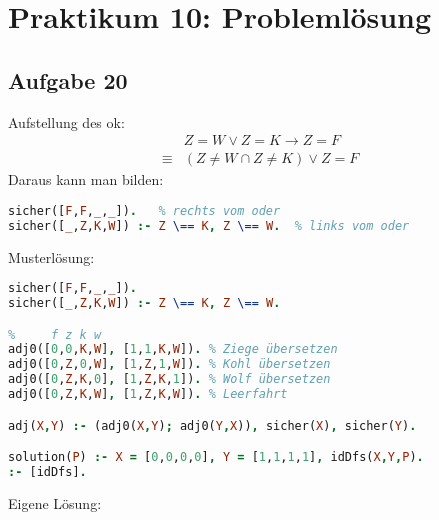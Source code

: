 \documentclass{scrreprt}
\begin{document}
\chapter{Praktikum 10: Problemlösung}
\section{Aufgabe 20}
Aufstellung des ok:
\begin{align*}
&Z=W \vee Z=K \to Z=F\\
\equiv& (Z \not = W \cap Z \not = K) \vee Z=F
\end{align*}
Daraus kann man bilden:
\begin{lstlisting}[language=Prolog]
sicher([F,F,_,_]).	 % rechts vom oder
sicher([_,Z,K,W]) :- Z \== K, Z \== W.	% links vom oder
\end{lstlisting}
Musterlösung:
\begin{lstlisting}[language=Prolog]
%				f z k w
sicher([F,F,_,_]).
sicher([_,Z,K,W]) :- Z \== K, Z \== W.

%     f z k w
adj0([0,0,K,W], [1,1,K,W]).	% Ziege übersetzen
adj0([0,Z,0,W], [1,Z,1,W]).	% Kohl übersetzen
adj0([0,Z,K,0], [1,Z,K,1]).	% Wolf übersetzen
adj0([0,Z,K,W], [1,Z,K,W]).	% Leerfahrt

adj(X,Y) :- (adj0(X,Y); adj0(Y,X)), sicher(X), sicher(Y).

solution(P) :- X = [0,0,0,0], Y = [1,1,1,1], idDfs(X,Y,P).
:- [idDfs].
\end{lstlisting}
Eigene Lösung:

\end{document}
